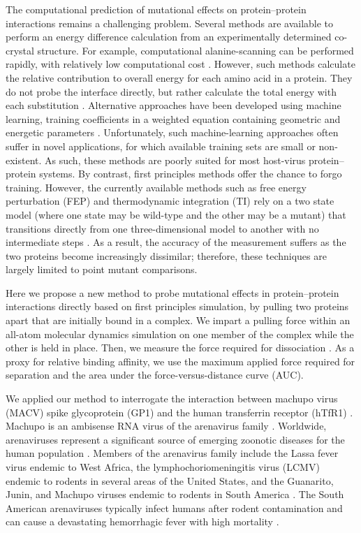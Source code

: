 \documentclass[journal=jacsat,manuscript=article]{achemso}
\begin{document}
The computational prediction of mutational effects on protein--protein interactions remains a challenging problem. Several methods are available to perform an energy difference calculation from an experimentally determined co-crystal structure. For example, computational alanine-scanning can be performed rapidly, with relatively low computational cost \cite{Grant2011,Kortemme2004}. However, such methods calculate the relative contribution to overall energy for each amino acid in a protein. They do not probe the interface directly, but rather calculate the total energy with each substitution \cite{Grant2011,Kortemme2004}. Alternative approaches have been developed using machine learning, training coefficients in a weighted equation containing geometric and energetic parameters \cite{Vreven2011,Vreven2012,Bajaj2011,Hwang2010}. Unfortunately, such machine-learning approaches often suffer in novel applications, for which available training sets are small or non-existent. As such, these methods are poorly suited for most host-virus protein--protein systems. By contrast, first principles methods offer the chance to forgo training. However, the currently available methods such as free energy perturbation (FEP) and thermodynamic integration (TI) rely on a two state model (where one state may be wild-type and the other may be a mutant) that transitions directly from one three-dimensional model to another with no intermediate steps \cite{Gilson1997,Lu2004,Chodera2011,Gumbart2013}. As a result, the accuracy of the measurement suffers as the two proteins become increasingly dissimilar; therefore, these techniques are largely limited to point mutant comparisons.

Here we propose a new method to probe mutational effects in protein--protein interactions directly based on first principles simulation, by pulling two proteins apart that are initially bound in a complex. We impart a pulling force within an all-atom molecular dynamics simulation on one member of the complex while the other is held in place. Then, we measure the force required for dissociation \cite{Gumbart2012,Lu1999,Park2004,Is2001A,Is2001B}. As a proxy for relative binding affinity, we use the maximum applied force required for separation and the area under the force-versus-distance curve (AUC). 

We applied our method to interrogate the interaction between machupo virus (MACV) spike glycoprotein (GP1) and the human transferrin receptor (hTfR1) \cite{Abraham2010,Charrel2003}. Machupo is an ambisense RNA virus of the arenavirus family \cite{Charrel2003}. Worldwide, arenaviruses represent a significant source of emerging zoonotic diseases for the human population \cite{Charrel2003}. Members of the arenavirus family include the Lassa fever virus endemic to West Africa, the lymphochoriomeningitis virus (LCMV) endemic to rodents in several areas of the United States, and the Guanarito, Junin, and Machupo viruses endemic to rodents in South America \cite{Charrel2003}. The South American arenaviruses typically infect humans after rodent contamination and can cause a devastating hemorrhagic fever with high mortality \cite{Charrel2003}.
\end{document}
